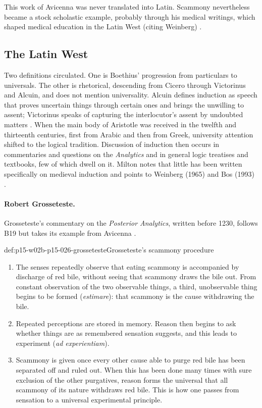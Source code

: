 This work of Avicenna was never translated into Latin. Scammony
nevertheless became a stock scholastic example, probably through his
medical writings, which shaped medical education in the Latin West
(citing Weinberg) \cite[p.~16]{Milton2011InductionBeforeHume}.

\subsection{The Latin West}

Two definitions circulated. One is Boethius' progression from particulars
to universals. The other is rhetorical, descending from Cicero through
Victorinus and Alcuin, and does not mention universality. Alcuin defines
induction as speech that proves uncertain things through certain ones and
brings the unwilling to assent; Victorinus speaks of capturing the
interlocutor's assent by undoubted matters
\cite[p.~16, n.~9]{Milton2011InductionBeforeHume}. When the main body of
Aristotle was received in the twelfth and thirteenth centuries, first from
Arabic and then from Greek, university attention shifted to the logical
tradition. Discussion of induction then occurs in commentaries and
questions on the \emph{Analytics} and in general logic treatises and
textbooks, few of which dwell on it. Milton notes that little has been
written specifically on medieval induction and points to Weinberg (1965)
and Bos (1993) \cite[p.~17]{Milton2011InductionBeforeHume}.

\paragraph{Robert Grosseteste.}
Grosseteste's commentary on the \emph{Posterior Analytics}, written before
1230, follows B19 but takes its example from Avicenna
\cite[p.~17]{Milton2011InductionBeforeHume}.

\begin{hbexample}{def:p15-w02b-p15-026-grosseteste}{Grosseteste's scammony procedure}
\begin{enumerate}
\item The senses repeatedly observe that eating scammony is accompanied by
  discharge of red bile, without seeing that scammony draws the bile out.
  From constant observation of the two observable things, a third,
  unobservable thing begins to be formed (\emph{estimare}): that scammony is
  the cause withdrawing the bile.
\item Repeated perceptions are stored in memory. Reason then begins to ask
  whether things are as remembered sensation suggests, and this leads to
  experiment (\emph{ad experientiam}).
\item Scammony is given once every other cause able to purge red bile has
  been separated off and ruled out. When this has been done many times with sure
  exclusion of the other purgatives, reason forms the universal that all
  scammony of its nature withdraws red bile. This is how one passes from
  sensation to a universal experimental principle.
\end{enumerate}
\cite[pp.~17--18]{Milton2011InductionBeforeHume}
\end{hbexample}

